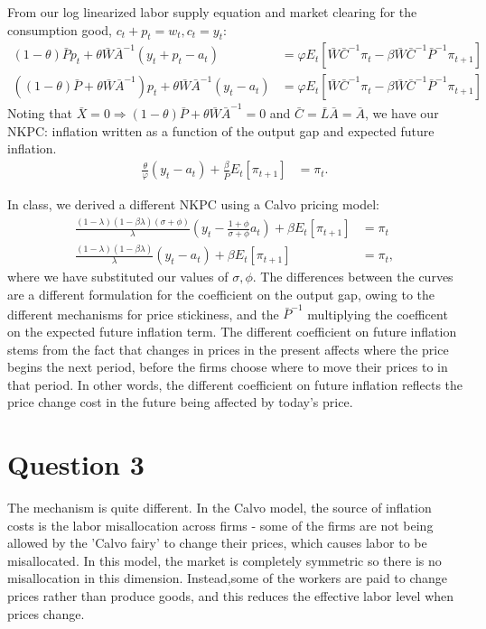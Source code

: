 \documentclass[11pt]{article} %
\begin{document}
From our log linearized labor supply equation and market clearing for the consumption good, $c_t + p_t = w_t, c_t = y_t$:
\begin{align*}
(1-\theta)\bar{P}p_t + \theta\bar{W}\bar{A}^{-1}(y_t + p_t - a_t) &= \varphi E_t[ \bar{W}\bar{C}^{-1}\pi_t -  \beta \bar{W}\bar{C}^{-1}\bar{P}^{-1}\pi_{t+1}]\\
((1-\theta)\bar{P} + \theta\bar{W}\bar{A}^{-1} )p_t + \theta\bar{W}\bar{A}^{-1}(y_t - a_t) &= \varphi E_t[\bar{W}\bar{C}^{-1}\pi_t -  \beta\bar{W}\bar{C}^{-1}\bar{P}^{-1}\pi_{t+1} ]
\end{align*}
Noting that $\bar{X} = 0 \Rightarrow (1-\theta)\bar{P} + \theta\bar{W}\bar{A}^{-1} = 0$ and $\bar{C} = \bar{L}\bar{A} = \bar{A}$, we have our NKPC: inflation written as a function of the output gap and expected future inflation.
\begin{align}
 \frac{\theta}{\varphi}(y_t - a_t) + \frac{\beta}{\bar{P}}E_t[\pi_{t+1} ] &=\pi_t. \label{NKPC}
\end{align}

In class, we derived a different NKPC using a Calvo pricing model:
\begin{align*}
\frac{(1-\lambda)(1-\beta\lambda)(\sigma + \phi)}{\lambda}\left(y_t - \frac{1+\phi}{\sigma + \phi}a_t\right) + \beta E_{t}[ \pi_{t+1}] &= \pi_t\\
\frac{(1-\lambda)(1-\beta\lambda)}{\lambda}\left(y_t -a_t\right) + \beta E_{t}[ \pi_{t+1}] &= \pi_t,
\end{align*}
where we have substituted our values of $\sigma,\phi$. The differences between the curves are a different formulation for the coefficient on the output gap, owing to the different mechanisms for price stickiness, and the $\bar{P}^{-1}$ multiplying the coefficent on the expected future inflation term. The different coefficient on future inflation stems from the fact that changes in prices in the present affects where the price begins the next period, before the firms choose where to move their prices to in that period. In other words, the different coefficient on future inflation reflects the price change cost in the future being affected by today's price.
\section{Question 3}
The mechanism is quite different. In the Calvo model, the source of inflation costs is the labor misallocation across firms - some of the firms are not being allowed by the 'Calvo fairy' to change their prices, which causes labor to be misallocated. In this model, the market is completely symmetric so there is no misallocation in this dimension. Instead,some of the workers are paid to change prices rather than produce goods, and this reduces the effective labor level when prices change.
\end{document}
